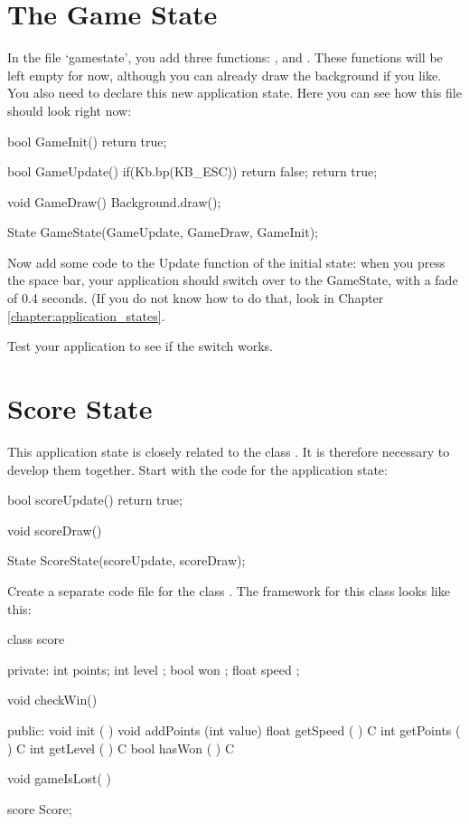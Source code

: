 \section{The Game State}

In the file `gamestate', you add three functions: ,  and . These functions will be left empty for now, although you can already draw the background if you like. You also need to declare this new application state. Here you can see how this file should look right now:

\begin{code}
bool GameInit()
{
   return true;
}

bool GameUpdate()
{
   if(Kb.bp(KB_ESC)) return false;  
   return true;
}

void GameDraw()
{
   Background.draw();
}

State GameState(GameUpdate, GameDraw, GameInit);
\end{code}

Now add some code to the Update function of the initial state: when you press the space bar, your application should switch over to the GameState, with a fade of 0.4 seconds. (If you do not know how to do that, look in Chapter \ref{chapter:application_states}.

Test your application to see if the switch works.

\section{Score State}

This application state is closely related to the class . It is therefore necessary to develop them together. Start with the code for the application state:

\begin{code}
bool scoreUpdate() { 
  return true;
}

void scoreDraw() {}

State ScoreState(scoreUpdate, scoreDraw);
\end{code}

Create a separate code file for the class . The framework for this class looks like this:

\begin{code}
class score
{
private:
   int   points;
   int   level ;
   bool  won   ;
   float speed ;
   
   void checkWin() {}
   
public:   
   void  init      (         )   {}   
   void  addPoints (int value)   {}   
   float getSpeed  (         ) C {}
   int   getPoints (         ) C {}
   int   getLevel  (         ) C {}
   bool  hasWon    (         ) C {}
   
   void  gameIsLost(         )   {}
}

score Score;
\end{code}

